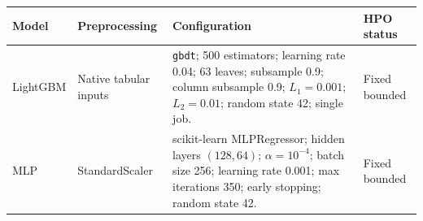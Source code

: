 \begin{tabular}{p{}p{}p{}p{}}
\toprule
Model & Preprocessing & Configuration & HPO status \\
\midrule
LightGBM & Native tabular inputs & \texttt{gbdt}; 500 estimators; learning rate 0.04; 63 leaves; subsample 0.9; column subsample 0.9; $L_1=0.001$; $L_2=0.01$; random state 42; single job. & Fixed bounded \\
MLP & StandardScaler & scikit-learn MLPRegressor; hidden layers $(128,64)$; $\alpha=10^{-4}$; batch size 256; learning rate 0.001; max iterations 350; early stopping; random state 42. & Fixed bounded \\
\bottomrule
\end{tabular}
